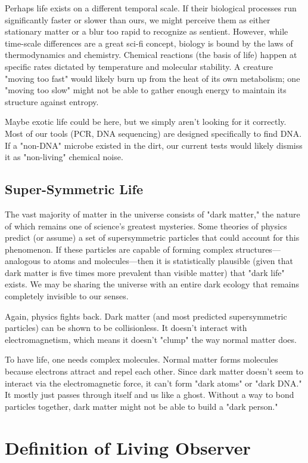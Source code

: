 Perhaps life exists on a different temporal scale. If their biological processes run significantly faster or slower than ours, we might perceive them as either stationary matter or a blur too rapid to recognize as sentient.
However, while time-scale differences are a great sci-fi concept, biology is bound by the laws of thermodynamics and chemistry.
Chemical reactions (the basis of life) happen at specific rates dictated by temperature and molecular stability.
A creature "moving too fast" would likely burn up from the heat of its own metabolism; one "moving too slow" might not be able to gather enough energy to maintain its structure against entropy.

Maybe exotic life could be here, but we simply aren't looking for it correctly.
Most of our tools (PCR, DNA sequencing) are designed specifically to find DNA.
If a "non-DNA" microbe existed in the dirt, our current tests would likely dismiss it as "non-living" chemical noise.


\subsection*{Super-Symmetric Life}

The vast majority of matter in the universe consists of "dark matter," the nature of which remains one of science's greatest mysteries.
Some theories of physics predict (or assume) a set of supersymmetric particles that could account for this phenomenon.
If these particles are capable of forming complex structures—analogous to atoms and molecules—then it is statistically plausible (given that dark matter is five times more prevalent than visible matter) that "dark life" exists.
We may be sharing the universe with an entire dark ecology that remains completely invisible to our senses.

Again, physics fights back. Dark matter (and most predicted supersymmetric particles) can be shown to be collisionless.
It doesn't interact with electromagnetism, which means it doesn't "clump" the way normal matter does.

To have life, one needs complex molecules. Normal matter forms molecules because electrons attract and repel each other.
Since dark matter doesn't seem to interact via the electromagnetic force, it can't form "dark atoms" or "dark DNA."
It mostly just passes through itself and us like a ghost. Without a way to bond particles together, dark matter might not be able to build a "dark person."


\section{Definition of Living Observer}

